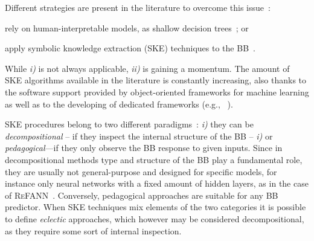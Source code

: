 \documentclass[sigconf]{acmart}
\begin{document}
Different strategies are present in the literature to overcome this issue~\cite{guidotti2018survey}:
%
\begin{inlinelist}
	\item rely on human-interpretable models, as shallow decision trees~\cite{Rudin2019}; or
	\item apply symbolic knowledge extraction (SKE) techniques to the BB~\cite{KENNY2021103459}.
\end{inlinelist}
%
While \textit{i)} is not always applicable, \textit{ii)} is gaining a momentum. The amount of SKE algorithms available in the literature is constantly increasing, also thanks to the software support provided by object-oriented frameworks for machine learning 
as well as to the developing of dedicated frameworks (e.g., \psyke{}~\cite{psyke-woa2021,psyke-ia2022,psyke-extraamas2022}).

SKE procedures belong to two different paradigms~\cite{andrews1995survey}: \textit{i)} they can be \emph{decompositional} -- if they inspect the internal structure of the BB -- \textit{i)} or \emph{pedagogical}---if they only observe the BB response to given inputs.
%
Since in decompositional methods type and structure of the BB play a fundamental role, they are usually not general-purpose and designed for specific models, for instance only neural networks with a fixed amount of hidden layers, as in the case of \textsc{ReFANN}~\cite{setiono2002extraction}.
%
Conversely, pedagogical approaches are suitable for any BB predictor.
%
When SKE techniques mix elements of the two categories it is possible to define \emph{eclectic} approaches, which however may be considered decompositional, as they require some sort of internal inspection.
\end{document}
